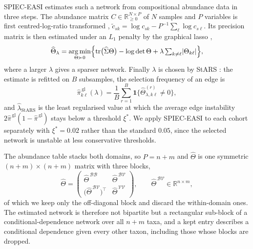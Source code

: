 SPIEC-EASI \citep{kurtz2015} estimates such a network from compositional abundance data in three steps.
The abundance matrix \(C\in\mathbb{R}_{\geq0}^{N\times P}\) of \(N\) samples and \(P\) variables is first
centred-log-ratio transformed \citep{aitchison1982},
\(\tilde c_{sk}=\log c_{sk}-P^{-1}\sum_{\ell}\log c_{s\ell}\). Its precision matrix is then estimated
under an \(L_{1}\) penalty by the graphical lasso \citep{friedman2008},
\begin{equation}\label{eq:glasso}
  \widehat\Theta_{\lambda}
  =\operatorname*{arg\,min}_{\Theta\succ0}
  \Bigl\{\operatorname{tr}\bigl(\widehat\Sigma\Theta\bigr)-\log\det\Theta
  +\lambda\textstyle\sum_{k\neq\ell}\lvert\Theta_{k\ell}\rvert\Bigr\},
\end{equation}
where a larger \(\lambda\) gives a sparser network. Finally \(\lambda\) is chosen by StARS
\citep{liu2010}: the estimate is refitted on \(B\) subsamples, the selection frequency of an edge is
\begin{equation}\label{eq:stars-pi}
  \widehat\pi^{\,\mathrm{gl}}_{k\ell}(\lambda)
  =\frac{1}{B}\sum_{r=1}^{B}
  \mathbf{1}\bigl\{\widehat\Theta^{(r)}_{\lambda,k\ell}\neq0\bigr\},
\end{equation}
and \(\widehat\lambda_{\mathrm{StARS}}\) is the least regularised value at which the average edge
instability \(2\widehat\pi^{\,\mathrm{gl}}(1-\widehat\pi^{\,\mathrm{gl}})\) stays below a threshold
\(\xi^{\ast}\). We apply SPIEC-EASI to each cohort separately with \(\xi^{\ast}=0.02\) rather than the
standard \(0.05\), since the selected network is unstable at less conservative thresholds.

The abundance table stacks both domains, so \(P=n+m\) and \(\widehat\Theta\) is one symmetric
\((n+m)\times(n+m)\) matrix with three blocks,
\begin{equation}\label{eq:blocks}
  \widehat\Theta=
  \begin{pmatrix}
    \widehat\Theta^{\,\mathcal{B}\mathcal{B}} & \widehat\Theta^{\,\mathcal{B}\mathcal{V}}\\[2pt]
    \bigl(\widehat\Theta^{\,\mathcal{B}\mathcal{V}}\bigr)^{\!\top} & \widehat\Theta^{\,\mathcal{V}\mathcal{V}}
  \end{pmatrix},
  \qquad
  \widehat\Theta^{\,\mathcal{B}\mathcal{V}}\in\mathbb{R}^{n\times m},
\end{equation}
of which we keep only the off-diagonal block and discard the within-domain ones. The estimated network is
therefore not bipartite but a rectangular sub-block of a conditional-dependence network over all \(n+m\)
taxa, and a kept entry describes a conditional dependence given every other taxon, including those whose
blocks are dropped.

